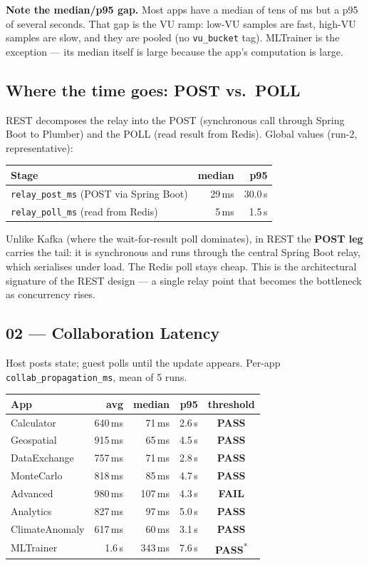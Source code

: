\documentclass[11pt,a4paper]{article}
\newcommand{\pass}{\textcolor{pass}{\textbf{PASS}}}
\newcommand{\fail}{\textcolor{fail}{\textbf{FAIL}}}
\begin{document}
\medskip
\noindent\textbf{Note the median/p95 gap.} Most apps have a median of tens of
ms but a p95 of several seconds. That gap is the VU ramp: low-VU samples are
fast, high-VU samples are slow, and they are pooled (no \texttt{vu\_bucket}
tag). MLTrainer is the exception — its median itself is large because the app's
computation is large.

\subsection{Where the time goes: POST vs.\ POLL}\label{sec:postpoll}

REST decomposes the relay into the POST (synchronous call through Spring Boot
to Plumber) and the POLL (read result from Redis). Global values (run-2,
representative):

\begin{tabular}{@{}lrr@{}}
\toprule
\textbf{Stage} & \textbf{median} & \textbf{p95} \\
\midrule
\texttt{relay\_post\_ms} (POST via Spring Boot) & 29\,ms & 30.0\,s \\
\texttt{relay\_poll\_ms} (read from Redis)      & 5\,ms  & 1.5\,s  \\
\bottomrule
\end{tabular}

\medskip
\noindent Unlike Kafka (where the wait-for-result poll dominates), in REST the
\textbf{POST leg} carries the tail: it is synchronous and runs through the
central Spring Boot relay, which serialises under load. The Redis poll stays
cheap. This is the architectural signature of the REST design — a single relay
point that becomes the bottleneck as concurrency rises.

\subsection{02 — Collaboration Latency}

Host posts state; guest polls until the update appears.
Per-app \texttt{collab\_propagation\_ms}, mean of 5 runs.

\begin{tabular}{@{}lrrrc@{}}
\toprule
\textbf{App} & \textbf{avg} & \textbf{median} & \textbf{p95} & \textbf{threshold} \\
\midrule
Calculator      & 640\,ms & 71\,ms  & 2.6\,s & \pass \\
Geospatial      & 915\,ms & 65\,ms  & 4.5\,s & \pass \\
DataExchange    & 757\,ms & 71\,ms  & 2.8\,s & \pass \\
MonteCarlo      & 818\,ms & 85\,ms  & 4.7\,s & \pass \\
Advanced        & 980\,ms & 107\,ms & 4.3\,s & \fail \\
Analytics       & 827\,ms & 97\,ms  & 5.0\,s & \pass \\
ClimateAnomaly  & 617\,ms & 60\,ms  & 3.1\,s & \pass \\
MLTrainer       & 1.6\,s  & 343\,ms & 7.6\,s & \pass\textsuperscript{*} \\
\bottomrule
\end{tabular}
\end{document}
